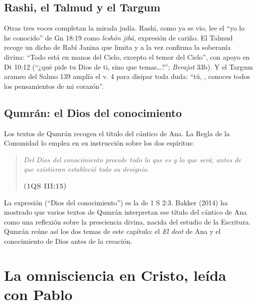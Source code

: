 
\subsection{Rashi, el Talmud y el Targum}
Otras tres voces completan la mirada judía. Rashi, como ya se vio, lee el ``yo lo he conocido'' de Gn 18:19 como \emph{leshón jibá}, expresión de cariño. El Talmud recoge un dicho de Rabí Janina que limita y a la vez confirma la soberanía divina: ``Todo está en manos del Cielo, excepto el temor del Cielo'', con apoyo en Dt 10:12 (``¿qué pide \SENOR{} tu Dios de ti, sino que temas\ldots?''; \emph{Berajot} 33b). Y el Targum arameo del Salmo 139 amplía el v. 4 para disipar toda duda: ``tú, \SENOR{}, conoces todos los pensamientos de mi corazón''.

\subsection{Qumrán: el Dios del conocimiento}
Los textos de Qumrán recogen el título del cántico de Ana. La Regla de la Comunidad lo emplea en su instrucción sobre los dos espíritus:

\begin{quote}\itshape
Del Dios del conocimiento procede todo lo que es y lo que será; antes de que existieran estableció todo su designio.\par\hfill{\upshape\small\bfseries\textcolor{azulp}{(1QS III:15)}}
\end{quote}

La expresión  (``Dios del conocimiento'') es la de 1 S 2:3. Bakker (2014) ha mostrado que varios textos de Qumrán interpretan ese título del cántico de Ana como una reflexión sobre la presciencia divina, nacida del estudio de la Escritura. Qumrán reúne así los dos temas de este capítulo: el \emph{El deot} de Ana y el conocimiento de Dios antes de la creación.


\section{La omnisciencia en Cristo, leída con Pablo}

